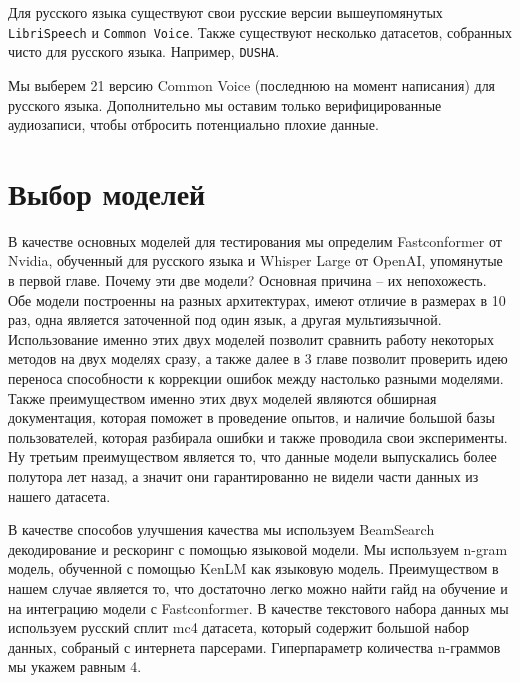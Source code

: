 Для русского языка существуют свои русские версии вышеупомянутых \texttt{LibriSpeech} и \texttt{Common Voice}.
Также существуют несколько датасетов, собранных чисто для русского языка. 
Например, \texttt{DUSHA}.

Мы выберем 21 версию Common Voice (последнюю на момент написания) для русского языка.
Дополнительно мы оставим только верифицированные аудиозаписи, чтобы отбросить потенциально плохие данные.

\section{Выбор моделей}
В качестве основных моделей для тестирования мы определим Fastconformer от Nvidia, обученный для русского языка и Whisper Large от OpenAI, упомянутые в первой главе.
Почему эти две модели? Основная причина – их непохожесть.
Обе модели построенны на разных архитектурах, имеют отличие в размерах в 10 раз, одна является заточенной под один язык, а другая мультиязычной.
Использование именно этих двух моделей позволит сравнить работу некоторых методов на двух моделях сразу, а также далее в 3 главе позволит проверить идею переноса способности к коррекции ошибок между настолько разными моделями.
Также преимуществом именно этих двух моделей являются обширная документация, которая поможет в проведение опытов, и наличие большой базы пользователей, которая разбирала ошибки и также проводила свои эксперименты.
Ну третьим преимуществом является то, что данные модели выпускались более полутора лет назад, а значит они гарантированно не видели части данных из нашего датасета.

В качестве способов улучшения качества мы используем BeamSearch декодирование и рескоринг с помощью языковой модели.
Мы используем n-gram модель, обученной с помощью KenLM как языковую модель.
Преимуществом в нашем случае является то, что достаточно легко можно найти гайд на обучение и на интеграцию модели с Fastconformer.
В качестве текстового набора данных мы используем русский сплит mc4 датасета, который содержит большой набор данных, собраный с интернета парсерами.
Гиперпараметр количества n-граммов мы укажем равным 4.

